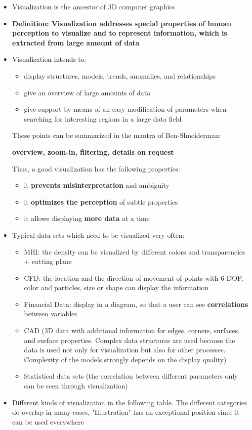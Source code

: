 \documentclass{standalone}
\begin{document}
\begin{itemize}
	\item Visualization is the ancestor of 3D computer graphics
	\item \textbf {Definition: Visualization addresses special properties of human perception to visualize and to represent information, which is extracted from large amount of data}
	\item Visualization intends to:
	\begin{itemize}
		\item display structures, models, trends, anomalies, and relationships
		\item give an overview of large amounts of data
		\item give support by means of an easy modification of parameters when searching for interesting regions in a large data field
	\end{itemize}
	These points can be summarized in the mantra of Ben-Shneiderman:
	\begin{center}
	\textbf{overview, zoom-in, filtering, details on request}
	\end{center}
	Thus, a good visualization has the following properties:
	\begin{itemize}
		\item it \textbf{prevents misinterpretation} and ambiguity
		\item it \textbf{optimizes the perception} of subtle properties
		\item it allows displaying \textbf{more data} at a time
	\end{itemize}
	\item Typical data sets which need to be visualized very often:
	\begin{itemize}
		\item MRI: the density can be visualized by different colors and transparencies + cutting plane
		\item CFD: the location and the direction of movement of points with 6 DOF, color and particles, size or shape can display the information
		\item Financial Data: display in a diagram, so that a user can see \textbf{correlations} between variables
		\item CAD (3D data with additional information for edges, corners, surfaces, and surface properties. Complex data structures are used because the data is used not only for visualization but also for other processes. Complexity of the models strongly depends on the display quality)
		\item Statistical data sets (the correlation between different parameters only can be seen through visualization)
	\end{itemize}
	\item Different kinds of visualization in the following table. The different categories do overlap in many cases, "Illustration" has an exceptional position since it can be used everywhere
\end{itemize}
\end{document}

